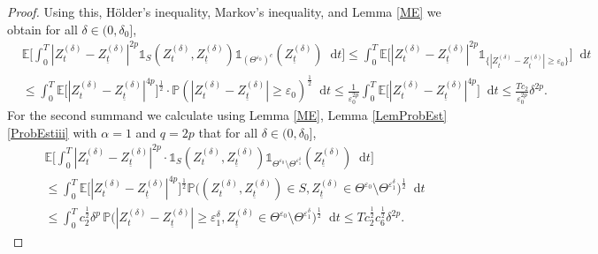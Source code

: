 \documentclass[11pt,a4paper]{article}
\numberwithin{equation}{section}
\theoremstyle{definition}
\newcommand{\E}{{\mathbb{E}}}
\renewcommand{\P}{{\mathbb{P}}}
\newcommand{\diff}{\mathop{}\!\mathrm{d}}
\begin{document}
\begin{proof}
    Using this, Hölder's inequality, Markov's inequality, and Lemma \ref{ME} we obtain for all $\delta\in(0,\delta_0]$,
    \begin{equation}
        \begin{aligned}
            &\E\Big[\int_0^T  |Z_{t}^{(\delta)} - Z_{\underline t}^{(\delta)}|^{2p} \mathds{1}_{S}(Z_{t}^{(\delta)},Z_{\underline t}^{(\delta)}) \mathds{1}_{(\Theta^{\varepsilon_0})^c}(Z_{\underline t}^{(\delta)}) \diff t \Big] 
            \leq \int_0^T \E\Big[|Z_{t}^{(\delta)} - Z_{\underline t}^{(\delta)}|^{2p} \mathds{1}_{\{|Z_{t}^{(\delta)}- Z_{\underline t}^{(\delta)}|\geq \varepsilon_0\}}\Big] \diff t \\
            &\leq \int_0^T \E\Big[|Z_{t}^{(\delta)} - Z_{\underline t}^{(\delta)}|^{4p}\Big]^{\frac{1}{2}}\cdot \P( |Z_{t}^{(\delta)}- Z_{\underline t}^{(\delta)}|\geq \varepsilon_0 )^{\frac{1}{2}} \diff t
            \leq \frac{1}{\varepsilon^{2p}_0} \int_0^T \E\Big[|Z_{t}^{(\delta)} - Z_{\underline t}^{(\delta)}|^{4p}\Big] \diff t
            \leq \frac{T c_2}{\varepsilon^{2p}_0}  \delta^{2p}.
        \end{aligned} 
    \end{equation}    
    For the second summand we calculate using Lemma \ref{ME}, Lemma \ref{LemProbEst} \ref{ProbEstiii} with $\alpha=1$ and $q=2p$ that for all $\delta\in(0,\delta_0]$,
    \begin{equation}
        \begin{aligned}
            &\E\Big[\int_0^T  |Z_{t}^{(\delta)} - Z_{\underline t}^{(\delta)}|^{2p}\cdot \mathds{1}_{S}(Z_{t}^{(\delta)},Z_{\underline t}^{(\delta)}) \mathds{1}_{\Theta^{\varepsilon_0}\setminus \Theta^{\varepsilon_1^\delta}}(Z_{\underline t}^{(\delta)}) \diff t \Big]\\
            &\leq \int_0^T \E\Big[  |Z_{t}^{(\delta)} - Z_{\underline t}^{(\delta)}|^{4p}\Big]^\frac{1}{2} \P\Big( (Z_{t}^{(\delta)},Z_{\underline t}^{(\delta)}) \in S, Z_{\underline t}^{(\delta)} \in \Theta^{\varepsilon_0}\setminus \Theta^{\varepsilon_1^\delta}\Big)^{\frac{1}{2}} \diff t\\
            &\leq \int_0^T c_2^{\frac{1}{2}} \delta^p\, \P\Big(  |Z_{t}^{(\delta)}- Z_{\underline t}^{(\delta)}|\geq \varepsilon^\delta_1, Z_{\underline t}^{(\delta)} \in \Theta^{\varepsilon_0}\setminus \Theta^{\varepsilon_1^\delta}\Big)^{\frac{1}{2}} \diff t
            \leq T c_2^{\frac{1}{2}} c_6^{\frac{1}{2}} \delta^{2p}.
        \end{aligned} 
    \end{equation}

\end{proof}
\end{document}
